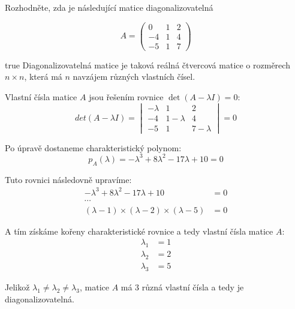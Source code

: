 \documentclass[10pt, a4paper]{ReportSheet}
\begin{document}
    \begin{uloha}{3}{3}{
        Rozhodněte, zda je následující matice diagonalizovatelná

        \[
            A = \begin{pmatrix}
                    0  & 1 & 2 \\
                    -4 & 1 & 4 \\
                    -5 & 1 & 7
            \end{pmatrix}
        \]
    }{true}
        Diagonalizovatelná matice je taková reálná čtvercová matice o rozměrech $n \times n$, která má $n$ navzájem různých
        vlastních čísel.

        Vlastní čísla matice $A$ jsou řešením rovnice $\det(A - \lambda I) = 0$:
        \begin{equation*}
            det(A - \lambda I) = \begin{vmatrix}
                                     -\lambda & 1           & 2           \\
                                     -4       & 1 - \lambda & 4           \\
                                     -5       & 1           & 7 - \lambda
            \end{vmatrix} = 0
        \end{equation*}

        Po úpravě dostaneme charakteristický polynom:
        \begin{equation*}
            p_A(\lambda) = -\lambda^3 + 8\lambda^2 - 17\lambda + 10 = 0
        \end{equation*}

        Tuto rovnici následovně upravíme:
        \begin{equation*}
            \begin{aligned}
                -\lambda^3 + 8\lambda^2 - 17\lambda + 10 &= 0 \\
                \cdots \\
                (\lambda - 1) \times (\lambda - 2) \times (\lambda - 5) &= 0
            \end{aligned}
        \end{equation*}

        A tím získáme kořeny charakteristické rovnice a tedy vlastní čísla matice $A$:
        \begin{equation*}
            \begin{aligned}
                \lambda_1 &= 1 \\
                \lambda_2 &= 2 \\
                \lambda_3 &= 5
            \end{aligned}
        \end{equation*}

        Jelikož $\lambda_1 \ne \lambda_2 \ne \lambda_3$, matice $A$ má 3 různá vlastní čísla a tedy je diagonalizovatelná.
    \end{uloha}
\end{document}

